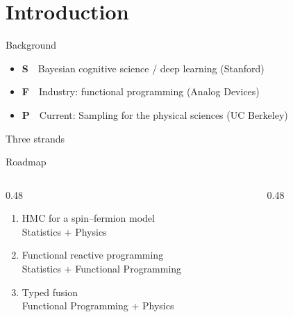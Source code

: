 \section{Introduction}
\renewcommand{\currentEdge}{all}

\begin{frame}{Background}
  \begin{itemize}
    \item {\color{strandS}\textbf{S}~~Bayesian cognitive science / deep learning (Stanford)}
    \item {\color{strandF}\textbf{F}~~Industry: functional programming (Analog Devices)}
    \item {\color{strandP}\textbf{P}~~Current: Sampling for the physical sciences (UC Berkeley)}
  \end{itemize}
\end{frame}

\begin{frame}{Three strands}
  \begin{center}
  \end{center}
\end{frame}

\begin{frame}{Roadmap}
  \begin{columns}[T]
    \begin{column}{0.48\textwidth}
      \begin{enumerate}
        \item HMC for a spin--fermion model \\
          {\small Statistics + Physics}
        \item Functional reactive programming \\
          {\small Statistics + Functional Programming}
        \item Typed fusion \\
          {\small Functional Programming + Physics}
      \end{enumerate}
    \end{column}
    \begin{column}{0.48\textwidth}
      \centering
    \end{column}
  \end{columns}
\end{frame}
